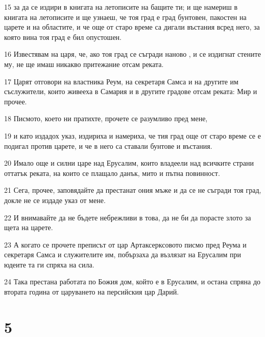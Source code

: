 \par 15 за да се издири в книгата на летописите на бащите ти; и ще намериш в книгата на летописите и ще узнаеш, че тоя град е град бунтовен, пакостен на царете и на областите, и че още от старо време са дигали въстания всред него, за която вина тоя град е бил опустошен.
\par 16 Известявам на царя, че, ако тоя град се съгради наново , и се издигнат стените му, не ще имаш никакво притежание отсам реката.
\par 17 Царят отговори на властника Реум, на секретаря Самса и на другите им съслужители, които живееха в Самария и в другите градове отсам реката: Мир и прочее.
\par 18 Писмото, което ни пратихте, прочете се разумливо пред мене,
\par 19 и като издадох указ, издириха и намериха, че тия град още от старо време се е подигал против царете, и че в него са ставали бунтове и въстания.
\par 20 Имало още и силни царе над Ерусалим, които владеели над всичките страни оттатък реката, на които се плащало данък, мито и пътна повинност.
\par 21 Сега, прочее, заповядайте да престанат ония мъже и да се не съгради тоя град, докле не се издаде указ от мене.
\par 22 И внимавайте да не бъдете небрежливи в това, да не би да порасте злото за щета на царете.
\par 23 А когато се прочете преписът от цар Артаксерксовото писмо пред Реума и секретаря Самса и служителите им, побързаха да възлязат на Ерусалим при юдеите та ги спряха на сила.
\par 24 Така престана работата по Божия дом, който е в Ерусалим, и остана спряна до втората година от царуването на персийския цар Дарий.

\chapter{5}

